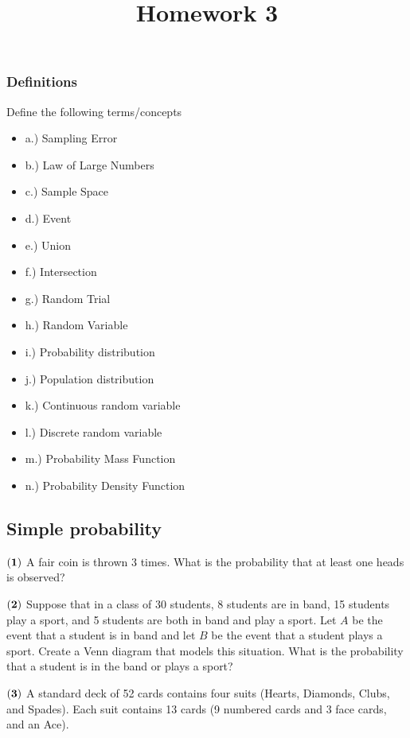 \documentclass[
]{article}
\title{Homework 3}
\author{}
\date{\vspace{-2.5em}}
\begin{document}
\maketitle

\subsubsection{Definitions}\label{definitions}

Define the following terms/concepts

\begin{itemize}
\item
  a.) Sampling Error
\item
  b.) Law of Large Numbers
\item
  c.) Sample Space
\item
  d.) Event
\item
  e.) Union
\item
  f.) Intersection
\item
  g.) Random Trial
\item
  h.) Random Variable
\item
  i.) Probability distribution
\item
  j.) Population distribution
\item
  k.) Continuous random variable
\item
  l.) Discrete random variable
\item
  m.) Probability Mass Function
\item
  n.) Probability Density Function
\end{itemize}

\subsection{Simple probability}\label{simple-probability}

\(\bf (1)\) A fair coin is thrown 3 times. What is the probability that
at least one heads is observed?

\(\bf (2)\) Suppose that in a class of 30 students, 8 students are in
band, 15 students play a sport, and 5 students are both in band and play
a sport. Let \(A\) be the event that a student is in band and let \(B\)
be the event that a student plays a sport. Create a Venn diagram that
models this situation. What is the probability that a student is in the
band or plays a sport?

\(\bf (3)\) A standard deck of 52 cards contains four suits (Hearts,
Diamonds, Clubs, and Spades). Each suit contains 13 cards (9 numbered
cards and 3 face cards, and an Ace).
\end{document}
